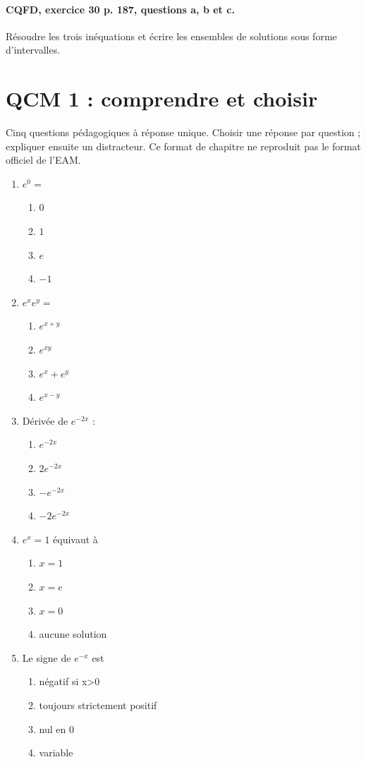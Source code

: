 \paragraph{CQFD, exercice 30 p. 187, questions a, b et c.}\label{C09-M2} Résoudre les trois inéquations et écrire les ensembles de solutions sous forme d’intervalles.
\begingroup\small
\clearpage\section*{QCM 1 : comprendre et choisir}\label{C09-Q1}
Cinq questions pédagogiques à réponse unique. Choisir une réponse par question ; expliquer ensuite un distracteur. Ce format de chapitre ne reproduit pas le format officiel de l’EAM.
\begin{enumerate}
\item $e^0=$
\begin{enumerate}[label=\Alph*.,itemsep=2pt]
\item $0$
\item $1$
\item $e$
\item $-1$
\end{enumerate}
\item $e^xe^y=$
\begin{enumerate}[label=\Alph*.,itemsep=2pt]
\item $e^{x+y}$
\item $e^{xy}$
\item $e^x+e^y$
\item $e^{x-y}$
\end{enumerate}
\item Dérivée de $e^{-2x}$ :
\begin{enumerate}[label=\Alph*.,itemsep=2pt]
\item $e^{-2x}$
\item $2e^{-2x}$
\item $-e^{-2x}$
\item $-2e^{-2x}$
\end{enumerate}
\item $e^x=1$ équivaut à
\begin{enumerate}[label=\Alph*.,itemsep=2pt]
\item $x=1$
\item $x=e$
\item $x=0$
\item aucune solution
\end{enumerate}
\item Le signe de $e^{-x}$ est
\begin{enumerate}[label=\Alph*.,itemsep=2pt]
\item négatif si x>0
\item toujours strictement positif
\item nul en 0
\item variable
\end{enumerate}
\end{enumerate}
